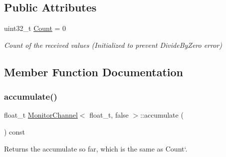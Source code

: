 \subsection*{Public Attributes}
\begin{DoxyCompactItemize}
\item 
uint32\+\_\+t \hyperlink{classMonitorChannel_3_01float__t_00_01false_01_4_ab79a9dadb04efa6fbc7db0d89b9affb5}{Count} = 0
\begin{DoxyCompactList}\small\item\em Count of the received values (Initialized to prevent Divide\+By\+Zero error) \end{DoxyCompactList}\end{DoxyCompactItemize}


\subsection{Member Function Documentation}
\mbox{\label{classMonitorChannel_3_01float__t_00_01false_01_4_afc9f578ffade7852c31557b2145e55bd}} 
\subsubsection{\texorpdfstring{accumulate()}{accumulate()}}
{\footnotesize\ttfamily float\+\_\+t \hyperlink{classMonitorChannel}{Monitor\+Channel}$<$ float\+\_\+t, false $>$\+::accumulate (\begin{DoxyParamCaption}{ }\end{DoxyParamCaption}) const\hspace{0.3cm}{\ttfamily [inline]}}



Returns the accumulate so far, which is the same as \textquotesingle{}Count`. 

\mbox{\label{classMonitorChannel_3_01float__t_00_01false_01_4_ad035163ed9dddabf74393e7e7570d8eb}} 
